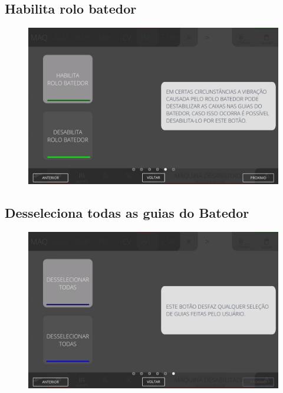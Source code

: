 \newpage
\thispagestyle{fancy}
\vspace{\fill}
\subsection{Habilita rolo batedor}
\begin{figure}
    \centering
    \includegraphics[width=576 px,height=360 px]{src/imagesICV/07-scout/commands/5.png}
\end{figure}

\newpage
\thispagestyle{fancy}
\vspace{\fill}
\subsection{Desseleciona todas as guias do Batedor}
\begin{figure}
    \centering
    \includegraphics[width=576 px,height=360 px]{src/imagesICV/07-scout/commands/6.png}
\end{figure}
